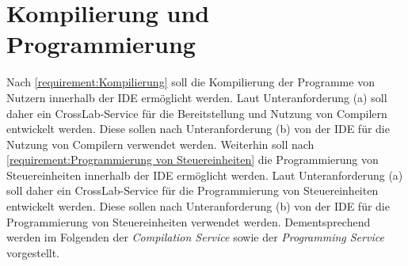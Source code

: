 \section{Kompilierung und Programmierung}\label{section:konzeption:kompilierung-und-programmierung}


Nach \autoref{requirement:Kompilierung} soll die Kompilierung der Programme von Nutzern innerhalb der IDE ermöglicht werden. Laut Unteranforderung (a) soll daher ein CrossLab-Service für die Bereitstellung und Nutzung von Compilern entwickelt werden. Diese sollen nach Unteranforderung (b) von der IDE für die Nutzung von Compilern verwendet werden. Weiterhin soll nach \autoref{requirement:Programmierung von Steuereinheiten} die Programmierung von Steuereinheiten innerhalb der IDE ermöglicht werden. Laut Unteranforderung (a) soll daher ein CrossLab-Service für die Programmierung von Steuereinheiten entwickelt werden. Diese sollen nach Unteranforderung (b) von der IDE für die Programmierung von Steuereinheiten verwendet werden. Dementsprechend werden im Folgenden der \textit{Compilation Service} sowie der \textit{Programming Service} vorgestellt.

